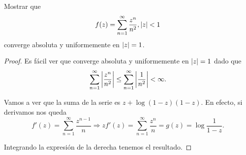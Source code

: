 
\begin{example}
    Mostrar que
    \begin{equation*}
        f(z) = \sum_{n=1}^{\infty} \frac{z^n}{n^2}, \left\lvert z\right\rvert < 1
    \end{equation*}
    converge absoluta y uniformemente en $\left\lvert z\right\rvert = 1$.
\end{example}

\begin{proof}
    Es fácil ver que converge absoluta y uniformemente en $\left\lvert z\right\rvert = 1$ dado que
    \begin{equation*}
        \sum_{n=1}^{\infty} \left\lvert\frac{z^n}{n^2}\right\rvert \leq \sum_{n=1}^{\infty} \left\lvert\frac{1}{n^2}\right\rvert < \infty.
    \end{equation*}


    Vamos a ver que la suma de la serie es $z + \log{(1 - z)(1 - z)}$. En efecto, si derivamos nos queda
    \begin{equation*}
        f'(z) =  \sum_{n=1}^{\infty} \frac{z^{n-1}}{n} \Rightarrow zf'(z) = \sum_{n=1}^{\infty} \frac{z^{n}}{n} = g(z) = \log{\frac{1}{1 - z}}.
    \end{equation*}

    Integrando la expresión de la derecha tenemos el resultado.
    \begin{comment}
    \begin{equation*}
        f''(z) =  \sum_{n=2}^{\infty} \frac{(n - 1)}{n} z^{n-2} =  \sum_{n=2}^{\infty} z^{n-2} - \sum_{n=2}^{\infty} \frac{1}{n} z^{n-2}
    \end{equation*}
     \begin{equation*}
         \sum_{n=2}^{\infty} z^{n-2} = \sum_{n=0}^{\infty} z^{n} = \frac{1}{1 - z}.
    \end{equation*}
    \end{comment}

 \end{proof}


